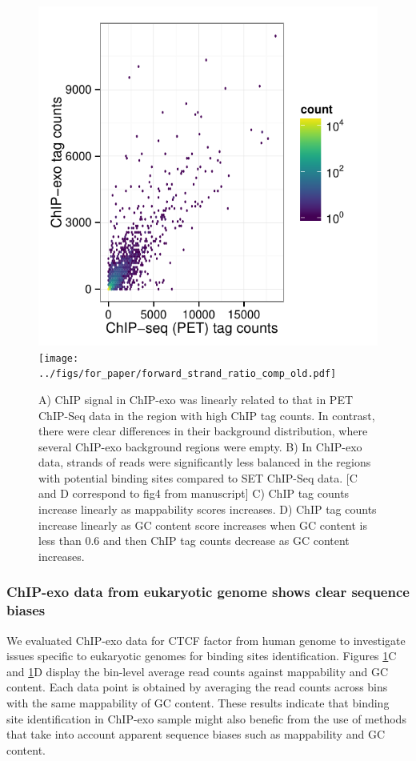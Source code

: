 \documentclass{bmcart}\usepackage[]{graphicx}\usepackage[]{color}
\begin{document}

\begin{figure}[h]
  \centering
  \includegraphics[width = .46\textwidth,page = 3 ]{../figs/for_paper/ChIPseqPET_ChIPexo_tagCount_comparison.pdf}
  \texttt{[image: ../figs/for\_paper/forward\_strand\_ratio\_comp\_old.pdf]}
  \caption{ A) ChIP signal in ChIP-exo was linearly related to that in
    PET ChIP-Seq data in the region with high ChIP tag counts. In
    contrast, there were clear differences in their background
    distribution, where several ChIP-exo background regions were
    empty. B) In ChIP-exo data, strands of reads were significantly
    less balanced in the regions with potential binding sites compared
    to SET ChIP-Seq data. [C and D correspond to fig4 from manuscript]
    C) ChIP tag counts increase linearly as mappability scores
    increases. D) ChIP tag counts increase linearly as GC content
    score increases when GC content is less than 0.6 and then ChIP tag
    counts decrease as GC content increases. }
  \label{fig:comp}
\end{figure}

\subsubsection{ChIP-exo data from eukaryotic genome shows clear sequence biases}
\label{sec:eukaryotic}

We evaluated ChIP-exo data for CTCF factor from human genome
\cite{exo1} to investigate issues specific to eukaryotic genomes for
binding sites identification. Figures \ref{fig:comp}C and
\ref{fig:comp}D display the bin-level average read counts against
mappability and GC content. Each data point is obtained by averaging
the read counts across bins with the same mappability of GC
content. These results indicate that binding site identification in
ChIP-exo sample might also benefic from the use of methods that take
into account apparent sequence biases such as mappability and GC
content.
\end{document}
